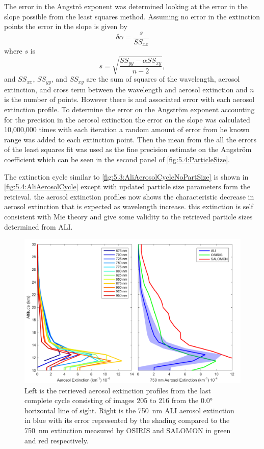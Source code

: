 The error in the Angstr\"{o} exponent was determined looking at the error in the slope possible from the least squares method. Assuming no error in the extinction points the error in the slope is given by
\begin{equation}
    \delta\alpha = \frac{s}{SS_{xx}}
\end{equation}
where $s$ is
\begin{equation}
    s = \sqrt{\frac{SS_{yy}-\alpha SS_{xy}}{n-2}},
\end{equation}
and $SS_{xx}$, $SS_{yy}$, and $SS_{xy}$  are the sum of squares of the wavelength, aerosol extinction, and cross term between the wavelength and aerosol extinction and $n$ is the number of points. However there is and associated error with each aerosol extinction profile. To determine the error on the Angstr\"{o}m exponent accounting for the precision in the aerosol extinction the error on the slope was calculated 10,000,000 times with each iteration a random amount of error from he known range was added to each extinction point. Then the mean from the all the errors of the least squares fit was used as the fine precision estimate on the Angstr\"{o}m coefficient which can be seen in the second panel of \autoref{fig:5.4:ParticleSize}.

The extinction cycle similar to \autoref{fig:5.3:AliAerosolCycleNoPartSize} is shown in \autoref{fig:5.4:AliAerosolCycle} except with updated particle size parameters form the retrieval. the aerosol extinction profiles now shows the characteristic decrease in aerosol extinction that is expected as wavelength increase. this extinction is self consistent with Mie theory and give some validity to the retrieved particle sizes determined from ALI.

\begin{figure}
\includegraphics[width=1.0\textwidth]{./Images/5-4-FullAerosolCycleComparison.pdf}
    \caption[Aerosol Retrievals with Corrected Particle Size for All Wavelengths and 750~nm Comparison with OSIRIS and SALOMON]{Left is the retrieved aerosol extinction profiles from the last complete cycle consisting of images 205 to 216 from the 0.0\si{\degree} horizontal line of sight. Right is the 750~nm ALI aerosol extinction in blue with its error represented by the shading compared to the 750~nm extinction measured by OSIRIS and SALOMON in green and red respectively.}
    \label{fig:5.4:AliAerosolCycle}
\end{figure}   